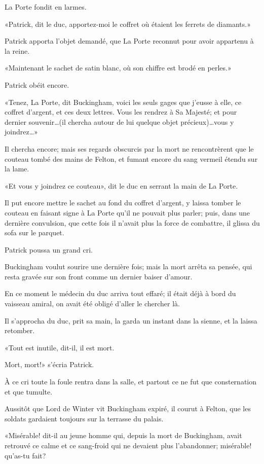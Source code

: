 La Porte fondit en larmes. 

«Patrick, dit le duc, apportez-moi le coffret où étaient les ferrets de diamants.» 

Patrick apporta l'objet demandé, que La Porte reconnut pour avoir appartenu à la reine. 

«Maintenant le sachet de satin blanc, où son chiffre est brodé en perles.» 

Patrick obéit encore. 

«Tenez, La Porte, dit Buckingham, voici les seuls gages que j'eusse à elle, ce coffret d'argent, et ces deux lettres. Vous les rendrez à Sa Majesté; et pour dernier souvenir\dots (il chercha autour de lui quelque objet précieux)\dots vous y joindrez\dots» 

Il chercha encore; mais ses regards obscurcis par la mort ne rencontrèrent que le couteau tombé des mains de Felton, et fumant encore du sang vermeil étendu sur la lame. 

«Et vous y joindrez ce couteau», dit le duc en serrant la main de La Porte. 

Il put encore mettre le sachet au fond du coffret d'argent, y laissa tomber le couteau en faisant signe à La Porte qu'il ne pouvait plus parler; puis, dans une dernière convulsion, que cette fois il n'avait plus la force de combattre, il glissa du sofa sur le parquet. 

Patrick poussa un grand cri. 

Buckingham voulut sourire une dernière fois; mais la mort arrêta sa pensée, qui resta gravée sur son front comme un dernier baiser d'amour. 

En ce moment le médecin du duc arriva tout effaré; il était déjà à bord du vaisseau amiral, on avait été obligé d'aller le chercher là. 

Il s'approcha du duc, prit sa main, la garda un instant dans la sienne, et la laissa retomber. 

«Tout est inutile, dit-il, il est mort. 

\speak  Mort, mort!» s'écria Patrick. 

À ce cri toute la foule rentra dans la salle, et partout ce ne fut que consternation et que tumulte. 

Aussitôt que Lord de Winter vit Buckingham expiré, il courut à Felton, que les soldats gardaient toujours sur la terrasse du palais. 

«Misérable! dit-il au jeune homme qui, depuis la mort de Buckingham, avait retrouvé ce calme et ce sang-froid qui ne devaient plus l'abandonner; misérable! qu'as-tu fait? 

